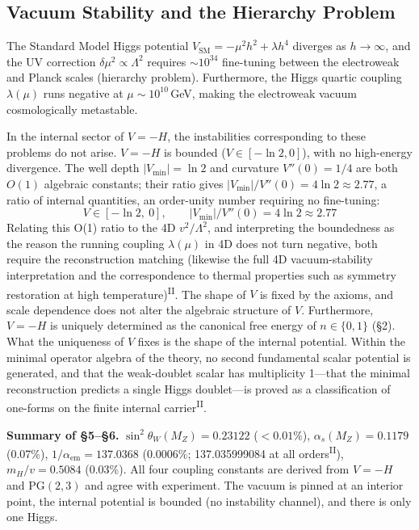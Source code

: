 \documentclass[12pt,a4paper]{article}
\newcommand{\PII}{\textsuperscript{\textup{II}}}
\begin{document}
\subsection{Vacuum Stability and the Hierarchy Problem}

The Standard Model Higgs potential $V_\mathrm{SM} = -\mu^2 h^2 + \lambda h^4$ diverges
as $h \to \infty$, and the UV correction $\delta\mu^2 \propto \Lambda^2$
requires $\sim 10^{34}$ fine-tuning between the electroweak and Planck scales (hierarchy problem).
Furthermore, the Higgs quartic coupling $\lambda(\mu)$ runs negative at $\mu \sim 10^{10}$\,GeV, making the electroweak vacuum cosmologically metastable.

In the internal sector of $V = -H$, the instabilities corresponding to
these problems do not arise.
$V = -H$ is bounded ($V \in [-\ln 2, 0]$), with no high-energy divergence.
The well depth $|V_{\min}| = \ln 2$ and curvature $V''(0) = 1/4$
are both $O(1)$ algebraic constants;
their ratio gives
$|V_{\min}|/V''(0) = 4\ln 2 \approx 2.77$, a ratio of internal quantities,
an order-unity number requiring no fine-tuning:
\[V \in [-\ln 2,\ 0],\qquad |V_{\min}|/V''(0) = 4\ln 2 \approx 2.77\]
Relating this O(1) ratio to the 4D $v^2/\Lambda^2$, and interpreting the boundedness as the reason the running coupling $\lambda(\mu)$ in 4D does not turn negative, both require the reconstruction matching (likewise the full 4D vacuum-stability interpretation and the correspondence to thermal properties such as symmetry restoration at high temperature)\PII{}.
The shape of $V$ is fixed by the axioms, and scale dependence does not alter the algebraic structure of $V$.
Furthermore, $V = -H$ is uniquely determined as the
canonical free energy of $n \in \{0,1\}$ (\S2).
What the uniqueness of $V$ fixes is the shape of the internal potential.
Within the minimal operator algebra of the theory, no second fundamental
scalar potential is generated, and that the weak-doublet scalar has
multiplicity 1---that the minimal reconstruction predicts a single
Higgs doublet---is proved as a classification of one-forms on the
finite internal carrier\PII{}.

\noindent\textbf{Summary of \S5--\S6.}\;
$\sin^2\!\theta_W(M_Z) = 0.23122$ ($<0.01\%$),
$\alpha_s(M_Z) = 0.1179$ (0.07\%),
$1/\alpha_\mathrm{em} = 137.0368$ (0.0006\%; 137.035999084 at all orders\PII{}),
$m_H/v = 0.5084$ (0.03\%).
All four coupling constants are derived from $V = -H$ and $\mathrm{PG}(2,3)$ and agree with experiment. The vacuum is pinned at an interior point, the internal potential is bounded (no instability channel), and there is only one Higgs.
\end{document}
